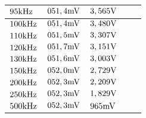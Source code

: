 \begin{table}[H]
\begin{tabular}{l||l|l||l|l|}
\multicolumn{1}{|l||}{$95\text{kHz}$}                      &$ 051,4\text{mV}     $&$ 3,565\text{V}       $&$             $&$              $\\ \hline
\multicolumn{1}{|l||}{$100\text{kHz}$}                     &$ 051,4\text{mV}     $&$ 3,480\text{V}       $&$             $&$              $\\ \hline
\multicolumn{1}{|l||}{$110\text{kHz}$}                     &$ 051,5\text{mV}     $&$ 3,307\text{V}       $&$             $&$              $\\ \hline
\multicolumn{1}{|l||}{$120\text{kHz}$}                     &$ 051,7\text{mV}     $&$ 3,151\text{V}       $&$             $&$              $\\ \hline
\multicolumn{1}{|l||}{$130\text{kHz}$}                     &$ 051,6\text{mV}     $&$ 3,003\text{V}       $&$             $&$              $\\ \hline
\multicolumn{1}{|l||}{$150\text{kHz}$}                     &$ 052,0\text{mV}     $&$ 2,729\text{V}       $&$             $&$              $\\ \hline
\multicolumn{1}{|l||}{$200\text{kHz}$}                     &$ 052,3\text{mV}     $&$ 2,209\text{V}       $&$             $&$              $\\ \hline
\multicolumn{1}{|l||}{$250\text{kHz}$}                     &$ 052,3\text{mV}     $&$ 1,829\text{V}       $&$             $&$              $\\ \hline
\multicolumn{1}{|l||}{$500\text{kHz}$}                     &$ 052,3\text{mV}     $&$ 965\text{mV}      $&$             $&$              $\\ \hline
\end{tabular}
\end{table}